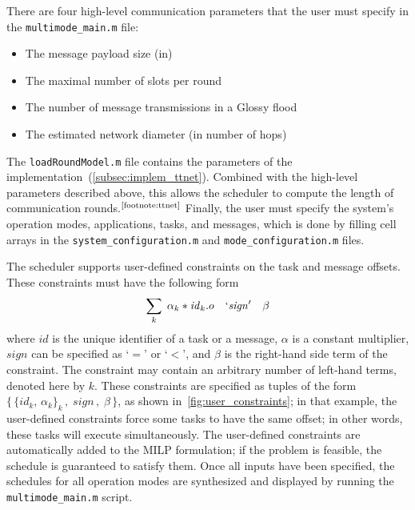 %
  There are four high-level communication parameters that the user must specify in the \texttt{multimode\_main.m} file:
  \begin{itemize}
    \item {} The message payload size (in\bytes)
    \item \customBox{\nslotsmax} The maximal number of slots per round
    \item {} The number of message transmissions in a Glossy flood~\cite{ferrari2011Glossy}
    \item {} The estimated network diameter (in number of hops)
  \end{itemize}
  The \texttt{loadRoundModel.m} file contains the parameters of the \TTnet implementation~(\cref{subsec:implem_ttnet}). Combined with the high-level parameters described above, this allows the scheduler to compute the length of communication rounds.$^{\text{\ref{footnote:ttnet}}}$
  Finally, the user must specify the system's operation modes, applications, tasks, and messages, which is done by filling cell arrays in the \texttt{system\_configuration.m} and \texttt{mode\_configuration.m} files.
%

The scheduler supports user-defined constraints on the task and message offsets. These constraints must have the following form
\begin{equation}
  \sum_k \; \alpha_k*\mathit{id}_k.o \quad\mathit{`sign'}\quad \beta
\end{equation}
where $\mathit{id}$ is the unique identifier of a task or a message, $\alpha$ is a constant multiplier, $\mathit{sign}$ can be specified as `$=$' or `$<$', and $\beta$ is the right-hand side term of the constraint. The constraint may contain an arbitrary number of left-hand terms, denoted here by $k$.
These constraints are specified as tuples of the form
$  \{\,\{\mathit{id}_k,\, \alpha_k \}_k\,,\; \mathit{sign}\,,\; \beta \,\}$, as shown in~\cref{fig:user_constraints}; in that example, the user-defined constraints force some tasks to have the same offset; in other words, these tasks will execute simultaneously.
The user-defined constraints are automatically added to the MILP formulation; if the problem is feasible, the schedule is guaranteed to satisfy them.
Once all inputs have been specified, the schedules for all operation modes are synthesized and displayed by running the \texttt{multimode\_main.m} script.

